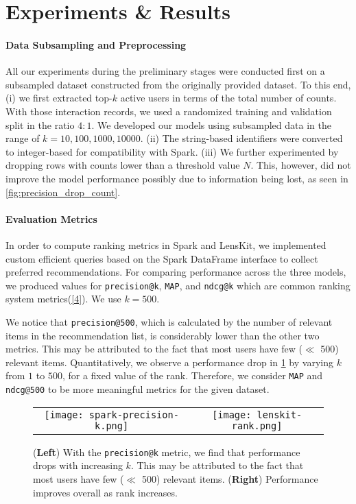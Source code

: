 \documentclass{article}
\begin{document}
\section{Experiments \& Results}\label{sec:results}

\paragraph{Data Subsampling and Preprocessing}
All our experiments during the preliminary stages were conducted first on a subsampled dataset constructed from the originally provided dataset. To this end, (i) we first extracted top-$k$ active users in terms of the total number of counts. With those interaction records, we used a randomized training and validation split in the ratio $4:1$. We developed our models using subsampled data in the range of $k = 10, 100, 1000, 10000$. (ii) The string-based identifiers were converted to integer-based for compatibility with Spark. (iii) We further experimented by dropping rows with counts lower than a threshold value $N$. This, however, did not improve the model performance possibly due to information being lost, as seen in \cref{fig:precision_drop_count}.

\paragraph{Evaluation Metrics} In order to compute ranking metrics in Spark and LensKit, we implemented custom efficient queries based 
on the Spark DataFrame interface to collect preferred recommendations. For comparing performance across the three models, we produced values for \texttt{precision@k}, \texttt{MAP}, and \texttt{ndcg@k} which are common ranking system metrics(\cref{4}). We use $k = 500$.

We notice that \texttt{precision@500}, which is calculated by the number of relevant items in the recommendation list, is considerably lower than the other two metrics. This may be attributed to the fact that most users have few ($\ll$ 500) relevant items. Quantitatively, we observe a performance drop in \cref{fig:precision_k_and_rank} by varying $k$ from $1$ to $500$, for a fixed value of the rank. Therefore, we consider \texttt{MAP} and \texttt{ndcg@500} to be more meaningful metrics for the given dataset.

\begin{figure}[!ht]
    \centering
    \begin{tabular}{cc}
        \texttt{[image: spark-precision-k.png]} & \texttt{[image: lenskit-rank.png]}
    \end{tabular}
    \caption{
    (\textbf{Left}) With the \texttt{precision@k} metric, we find that performance drops with increasing $k$. This may be attributed to the fact that most users have few ($\ll$ 500) relevant items.
    (\textbf{Right}) Performance improves overall as rank increases.
    }
    \label{fig:precision_k_and_rank}
\end{figure}
\end{document}
